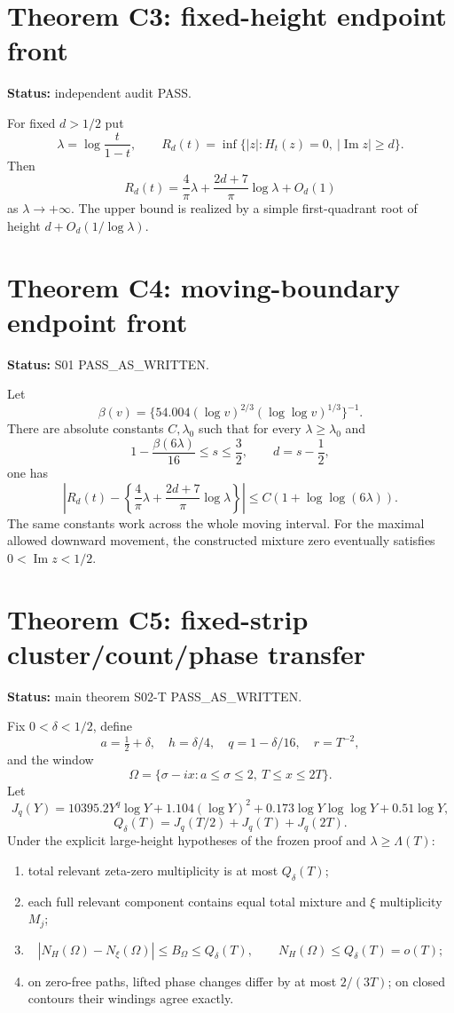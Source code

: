\documentclass[11pt]{article}
\begin{document}
\section*{Theorem C3: fixed-height endpoint front}
\textbf{Status:} independent audit PASS.

For fixed $d>1/2$ put
\[
\lambda=\log\frac{t}{1-t},\qquad
R_d(t)=\inf\{|z|:H_t(z)=0,\ |\operatorname{Im}z|\ge d\}.
\]
Then
\[
\boxed{
R_d(t)=\frac4\pi\lambda+\frac{2d+7}{\pi}\log\lambda+O_d(1)
}
\]
as $\lambda\to+\infty$. The upper bound is realized by a simple first-quadrant root of height
$d+O_d(1/\log\lambda)$.

\section*{Theorem C4: moving-boundary endpoint front}
\textbf{Status:} S01 PASS\_AS\_WRITTEN.

Let
\[
\beta(v)=\{54.004(\log v)^{2/3}(\log\log v)^{1/3}\}^{-1}.
\]
There are absolute constants $C,\lambda_0$ such that for every $\lambda\ge\lambda_0$ and
\[
1-\frac{\beta(6\lambda)}{16}\le s\le\frac32,\qquad d=s-\frac12,
\]
one has
\[
\boxed{
\left|
R_d(t)-
\left\{\frac4\pi\lambda+\frac{2d+7}{\pi}\log\lambda\right\}
\right|
\le C(1+\log\log(6\lambda)).
}
\]
The same constants work across the whole moving interval. For the maximal allowed downward
movement, the constructed mixture zero eventually satisfies
$0<\operatorname{Im}z<1/2$.

\section*{Theorem C5: fixed-strip cluster/count/phase transfer}
\textbf{Status:} main theorem S02-T PASS\_AS\_WRITTEN.

Fix $0<\delta<1/2$, define
\[
a=\tfrac12+\delta,\quad h=\delta/4,\quad q=1-\delta/16,\quad r=T^{-2},
\]
and the window
\[
\Omega=\{\sigma-ix:a\le\sigma\le2,\ T\le x\le2T\}.
\]
Let
\[
J_q(Y)=10395.2Y^q\log Y+
1.104(\log Y)^2+0.173\log Y\log\log Y+0.51\log Y,
\]
\[
Q_\delta(T)=J_q(T/2)+J_q(T)+J_q(2T).
\]
Under the explicit large-height hypotheses of the frozen proof and $\lambda\ge\Lambda(T)$:
\begin{enumerate}
\item total relevant zeta-zero multiplicity is at most $Q_\delta(T)$;
\item each full relevant component contains equal total mixture and $\xi$ multiplicity $M_j$;
\item
\[
|N_H(\Omega)-N_\xi(\Omega)|\le B_\Omega\le Q_\delta(T),
\qquad
N_H(\Omega)\le Q_\delta(T)=o(T);
\]
\item on zero-free paths, lifted phase changes differ by at most $2/(3T)$; on closed contours
their windings agree exactly.
\end{enumerate}
\end{document}
